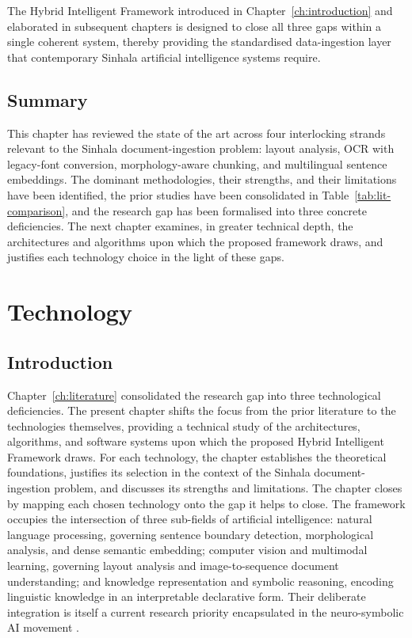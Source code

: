\documentclass[12pt,a4paper,oneside]{report}
\begin{document}
The Hybrid Intelligent Framework introduced in Chapter~\ref{ch:introduction} and elaborated in subsequent chapters is designed to close all three gaps within a single coherent system, thereby providing the standardised data-ingestion layer that contemporary Sinhala artificial intelligence systems require.

\section{Summary}
\label{sec:ch2-summary}
This chapter has reviewed the state of the art across four interlocking strands relevant to the Sinhala document-ingestion problem: layout analysis, OCR with legacy-font conversion, morphology-aware chunking, and multilingual sentence embeddings. The dominant methodologies, their strengths, and their limitations have been identified, the prior studies have been consolidated in Table~\ref{tab:lit-comparison}, and the research gap has been formalised into three concrete deficiencies. The next chapter examines, in greater technical depth, the architectures and algorithms upon which the proposed framework draws, and justifies each technology choice in the light of these gaps.

\chapter{Technology}
\label{ch:technology}

\section{Introduction}
Chapter~\ref{ch:literature} consolidated the research gap into three technological deficiencies. The present chapter shifts the focus from the prior literature to the technologies themselves, providing a technical study of the architectures, algorithms, and software systems upon which the proposed Hybrid Intelligent Framework draws. For each technology, the chapter establishes the theoretical foundations, justifies its selection in the context of the Sinhala document-ingestion problem, and discusses its strengths and limitations. The chapter closes by mapping each chosen technology onto the gap it helps to close. The framework occupies the intersection of three sub-fields of artificial intelligence: natural language processing, governing sentence boundary detection, morphological analysis, and dense semantic embedding; computer vision and multimodal learning, governing layout analysis and image-to-sequence document understanding; and knowledge representation and symbolic reasoning, encoding linguistic knowledge in an interpretable declarative form. Their deliberate integration is itself a current research priority encapsulated in the neuro-symbolic AI movement \cite{garcez2022neurosymbolic}.
\end{document}
